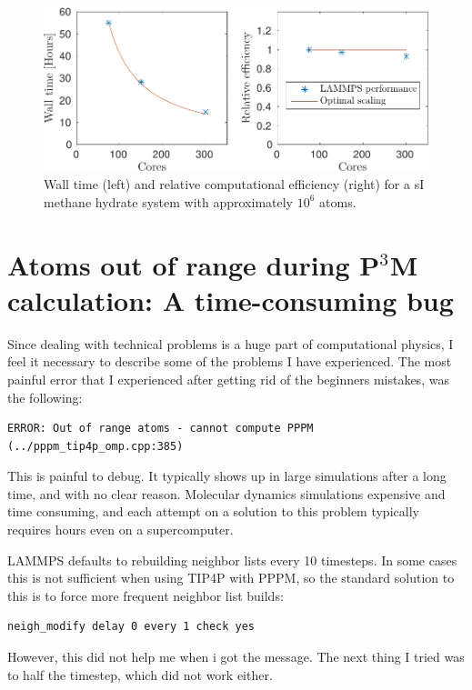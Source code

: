 \begin{figure}
\includegraphics[width=\textwidth]{../figures/thesis/lammps_efficiency.pdf}
\caption{Wall time (left) and relative computational efficiency (right) for a sI methane hydrate system with approximately $10^6$ atoms.}
\label{fig:lammps_efficiency}
\end{figure}

\section{Atoms out of range during P$^3$M calculation: A time-consuming bug}

Since dealing with technical problems is a huge part of computational physics, I feel it necessary to describe some of the problems I have experienced. The most painful error that I experienced after getting rid of the beginners mistakes, was the following:

\begin{verbatim}
ERROR: Out of range atoms - cannot compute PPPM (../pppm_tip4p_omp.cpp:385)
\end{verbatim}

This is painful to debug. It typically shows up in large simulations after a long time, and with no clear reason. Molecular dynamics simulations expensive and time consuming, and each attempt on a solution to this problem typically requires hours even on a supercomputer. 

LAMMPS defaults to rebuilding neighbor lists every 10 timesteps. In some cases this is not sufficient when using TIP4P with PPPM, so the standard solution to this is to force more frequent neighbor list builds:

\begin{lstlisting}[language=LammpsInput]
neigh_modify delay 0 every 1 check yes
\end{lstlisting}

However, this did not help me when i got the message. The next thing I tried was to half the timestep, which did not work either.

